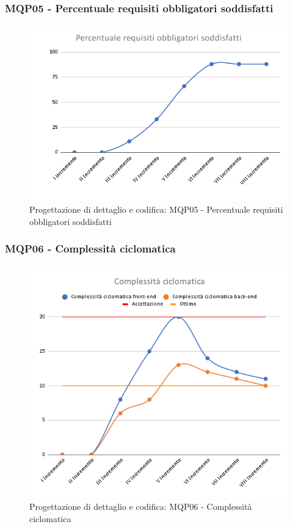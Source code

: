 \subsubsection{MQP05 - Percentuale requisiti obbligatori soddisfatti}
\begin{figure}[H]
    \centering
    \includegraphics[scale=0.50]{Sezioni/images/pb_prodotto/Percentuale_requisiti_obbligatori_soddisfatti.png}
    \caption{Progettazione di dettaglio e codifica: MQP05 - Percentuale requisiti obbligatori soddisfatti}
\end{figure}
\subsubsection{MQP06 - Complessità ciclomatica}
\begin{figure}[H]
    \centering
    \includegraphics[scale=0.50]{Sezioni/images/pb_prodotto/Complessita_ciclomatica.png}
    \caption{Progettazione di dettaglio e codifica: MQP06 - Complessità ciclomatica}
\end{figure}
